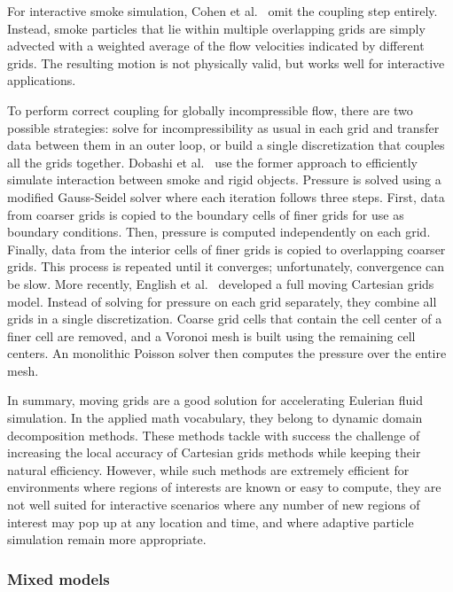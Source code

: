 For interactive smoke simulation, Cohen et al.~\cite{Cohen2010} omit the coupling step entirely.
Instead, smoke particles that lie within multiple overlapping grids are simply advected with a weighted average of the flow velocities indicated by different grids.
The resulting motion is not physically valid, but works well for interactive applications.

To perform correct coupling for globally incompressible flow, there are two possible strategies: solve for incompressibility as usual in each grid and transfer data between them in an outer loop, or build a single discretization that couples all the grids together.
Dobashi et al.~\cite{Dobashi2008:adaptiveGrid} use the former approach to efficiently simulate interaction between smoke and rigid objects. Pressure is solved using a modified Gauss-Seidel solver where each iteration follows three steps.
First, data from coarser grids is copied to the boundary cells of finer grids for use as boundary conditions.
Then, pressure is computed independently on each grid.
Finally, data from the interior cells of finer grids is copied to overlapping coarser grids.
This process is repeated until it converges; unfortunately, convergence can be slow.
More recently, English et al.~\cite{English2013} developed a full moving Cartesian grids model.
Instead of solving for pressure on each grid separately, they combine all grids in a single discretization.
Coarse grid cells that contain the cell center of a finer cell are removed, and a Voronoi mesh is built using the remaining cell centers.
An monolithic Poisson solver then computes the pressure over the entire mesh.

In summary, moving grids are a good solution for accelerating Eulerian fluid simulation. In the applied math vocabulary, they belong to dynamic domain decomposition methods.
These methods tackle with success the challenge of increasing the local accuracy of Cartesian grids methods while keeping their natural efficiency. However, while such methods are extremely efficient for environments where regions of interests are known or easy to compute, they are not well suited for interactive scenarios where any number of new regions of interest may pop up at any location and time, and where adaptive particle simulation remain more appropriate.

\subsubsection{Mixed models}
\label{sec:mixed-models}


